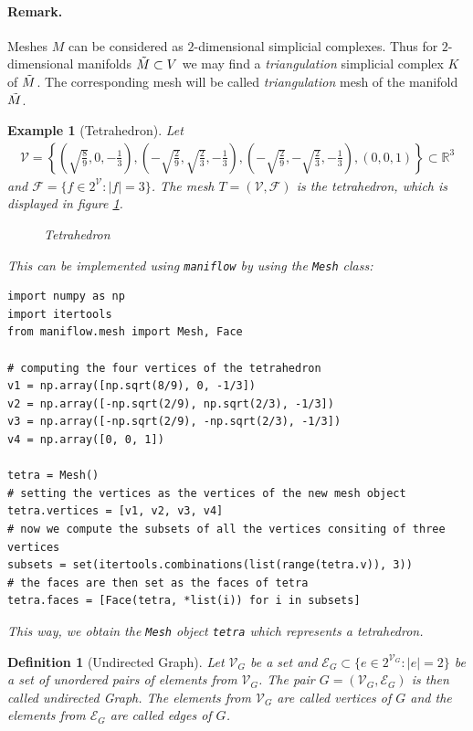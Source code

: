 \documentclass{article}
\newtheorem{defi}{Definition}
\newtheorem{ex}{Example}
\newcommand{\R}{\mathbb{R}}
\newcommand{\V}{\mathcal{V}}
\newcommand{\E}{\mathcal{E}}
\begin{document}
\paragraph{Remark.} Meshes $M$ can be considered as $2$-dimensional simplicial complexes. Thus for $2$-dimensional manifolds $\Tilde{M}\subset V$ we may find a \textit{triangulation} simplicial complex $K$ of $\Tilde{M}$. The corresponding mesh will be called \textit{triangulation} mesh of the manifold $\Tilde{M}$.
\begin{ex}[Tetrahedron] Let 
\begin{align*}
    \mathcal{V} = \left\{\left(\sqrt{\frac89},0,-\frac13\right),\left(-\sqrt{\frac29},\sqrt{\frac23},-\frac13\right),\left(-\sqrt{\frac29},-\sqrt{\frac23},-\frac13\right), \left(0,0,1\right)\right\}\subset\R^3
\end{align*}
and $\mathcal{F} = \{f\in2^{\mathcal{V}}:\vert f\vert = 3\}$. The mesh $T = (\mathcal{V},\mathcal{F})$ is the tetrahedron, which is displayed in figure \ref{fig:tetra}.
    \begin{figure}[h]
        \centering
        
        \caption{Tetrahedron}
        \label{fig:tetra}
    \end{figure}
This can be implemented using \texttt{maniflow} by using the \texttt{Mesh} class:
\begin{lstlisting}
import numpy as np
import itertools
from maniflow.mesh import Mesh, Face

# computing the four vertices of the tetrahedron
v1 = np.array([np.sqrt(8/9), 0, -1/3])
v2 = np.array([-np.sqrt(2/9), np.sqrt(2/3), -1/3])
v3 = np.array([-np.sqrt(2/9), -np.sqrt(2/3), -1/3])
v4 = np.array([0, 0, 1])

tetra = Mesh()
# setting the vertices as the vertices of the new mesh object
tetra.vertices = [v1, v2, v3, v4]
# now we compute the subsets of all the vertices consiting of three vertices
subsets = set(itertools.combinations(list(range(tetra.v)), 3))
# the faces are then set as the faces of tetra
tetra.faces = [Face(tetra, *list(i)) for i in subsets]
\end{lstlisting}
This way, we obtain the \texttt{Mesh} object \texttt{tetra} which represents a tetrahedron.
\end{ex}
\begin{defi}[Undirected Graph]
    Let $\V_G$ be a set and $\E_G\subset\{e\in2^{\V_G}: |e|=2\}$ be a set of unordered pairs of elements from $\V_G$. The pair $G = (\V_G, \E_G)$ is then called undirected Graph. The elements from $\V_G$ are called vertices of $G$ and the elements from $\E_G$ are called edges of $G$.
\end{defi}
\end{document}
